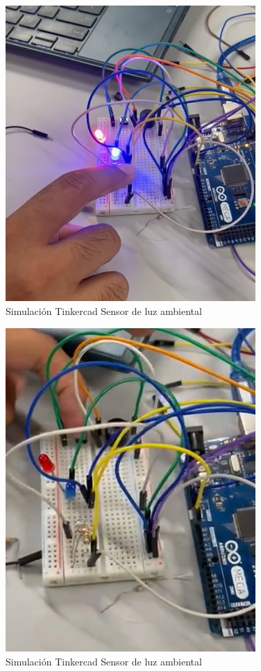 \documentclass{article}
\begin{document}
\begin{figure}[H]
    \centering
    \includegraphics[width=0.85\textwidth]{img/sensores_chkp_2.png}
    \caption{Simulación Tinkercad Sensor de luz ambiental}
    \label{fig:luz_ambiental}
\end{figure}

\begin{figure}[H]
    \centering
    \includegraphics[width=0.85\textwidth]{img/sensores_chkp_2_1.png}
    \caption{Simulación Tinkercad Sensor de luz ambiental}
    \label{fig:luz_ambiental}
\end{figure}
\end{document}

